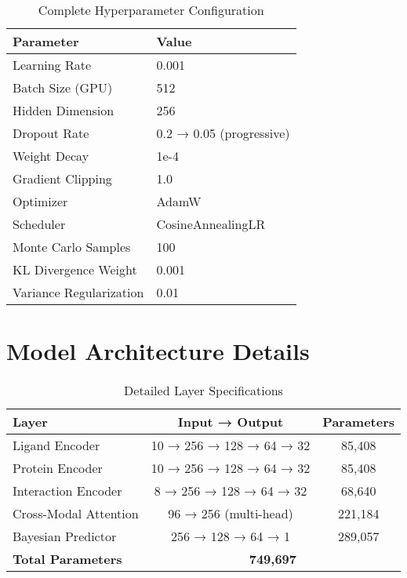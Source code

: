 \documentclass[11pt,a4paper]{article}
\begin{document}
\begin{table}[H]
\centering
\caption{Complete Hyperparameter Configuration}
\begin{tabular}{@{}ll@{}}
\toprule
\textbf{Parameter} & \textbf{Value} \\
\midrule
Learning Rate & 0.001 \\
Batch Size (GPU) & 512 \\
Hidden Dimension & 256 \\
Dropout Rate & 0.2 → 0.05 (progressive) \\
Weight Decay & 1e-4 \\
Gradient Clipping & 1.0 \\
Optimizer & AdamW \\
Scheduler & CosineAnnealingLR \\
Monte Carlo Samples & 100 \\
KL Divergence Weight & 0.001 \\
Variance Regularization & 0.01 \\
\bottomrule
\end{tabular}
\end{table}

\section{Model Architecture Details}

\begin{table}[H]
\centering
\caption{Detailed Layer Specifications}
\begin{tabular}{@{}lcc@{}}
\toprule
\textbf{Layer} & \textbf{Input → Output} & \textbf{Parameters} \\
\midrule
Ligand Encoder & 10 → 256 → 128 → 64 → 32 & 85,408 \\
Protein Encoder & 10 → 256 → 128 → 64 → 32 & 85,408 \\
Interaction Encoder & 8 → 256 → 128 → 64 → 32 & 68,640 \\
Cross-Modal Attention & 96 → 256 (multi-head) & 221,184 \\
Bayesian Predictor & 256 → 128 → 64 → 1 & 289,057 \\
\midrule
\textbf{Total Parameters} & \multicolumn{2}{c}{\textbf{749,697}} \\
\bottomrule
\end{tabular}
\end{table}
\end{document}
